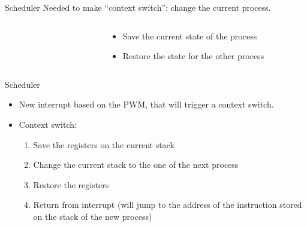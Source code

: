 \documentclass{beamer}
\begin{document}
    \begin{frame}{Scheduler}
      Needed to make ``context switch'': change the current process.

      \begin{columns}
        \begin{column}{0.4\textwidth}
          \begin{figure}
            \centering
          \end{figure}
        \end{column}
        \begin{column}{0.6\textwidth}
          \begin{itemize}
            \item Save the current state of the process
            \item Restore the state for the other process
          \end{itemize}

        \end{column}
      \end{columns}

    \end{frame}

    \begin{frame}{Scheduler}
      \begin{itemize}
        \item New interrupt based on the PWM, that will trigger a context switch.
        \item Context switch:
        \begin{enumerate}
           \item Save the registers on the current stack
           \item Change the current stack to the one of the next process
           \item Restore the registers
           \item Return from interrupt (will jump to the address of the instruction stored on the stack of the new process)
        \end{enumerate}
      \end{itemize}
    \end{frame}
\end{document}
